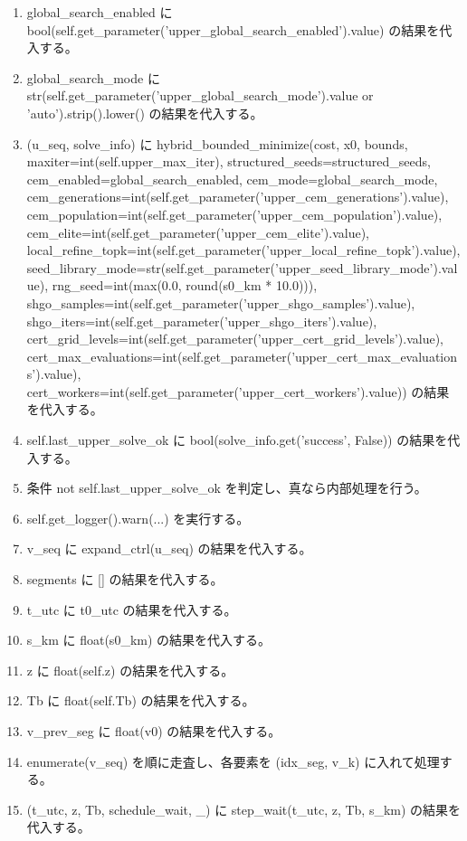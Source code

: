 \documentclass[a4paper,11pt]{article}
\begin{document}
\begin{enumerate}[leftmargin=1.8em]
\item global\_search\_enabled に bool(self.get\_parameter('upper\_global\_search\_enabled').value) の結果を代入する。
\item global\_search\_mode に str(self.get\_parameter('upper\_global\_search\_mode').value or 'auto').strip().lower() の結果を代入する。
\item (u\_seq, solve\_info) に hybrid\_bounded\_minimize(cost, x0, bounds, maxiter=int(self.upper\_max\_iter), structured\_seeds=structured\_seeds, cem\_enabled=global\_search\_enabled, cem\_mode=global\_search\_mode, cem\_generations=int(self.get\_parameter('upper\_cem\_generations').value), cem\_population=int(self.get\_parameter('upper\_cem\_population').value), cem\_elite=int(self.get\_parameter('upper\_cem\_elite').value), local\_refine\_topk=int(self.get\_parameter('upper\_local\_refine\_topk').value), seed\_library\_mode=str(self.get\_parameter('upper\_seed\_library\_mode').value), rng\_seed=int(max(0.0, round(s0\_km * 10.0))), shgo\_samples=int(self.get\_parameter('upper\_shgo\_samples').value), shgo\_iters=int(self.get\_parameter('upper\_shgo\_iters').value), cert\_grid\_levels=int(self.get\_parameter('upper\_cert\_grid\_levels').value), cert\_max\_evaluations=int(self.get\_parameter('upper\_cert\_max\_evaluations').value), cert\_workers=int(self.get\_parameter('upper\_cert\_workers').value)) の結果を代入する。
\item self.last\_upper\_solve\_ok に bool(solve\_info.get('success', False)) の結果を代入する。
\item 条件 not self.last\_upper\_solve\_ok を判定し、真なら内部処理を行う。
\item   self.get\_logger().warn(...) を実行する。
\item v\_seq に expand\_ctrl(u\_seq) の結果を代入する。
\item segments に [] の結果を代入する。
\item t\_utc に t0\_utc の結果を代入する。
\item s\_km に float(s0\_km) の結果を代入する。
\item z に float(self.z) の結果を代入する。
\item Tb に float(self.Tb) の結果を代入する。
\item v\_prev\_seg に float(v0) の結果を代入する。
\item enumerate(v\_seq) を順に走査し、各要素を (idx\_seg, v\_k) に入れて処理する。
\item   (t\_utc, z, Tb, schedule\_wait, \_) に step\_wait(t\_utc, z, Tb, s\_km) の結果を代入する。

\end{enumerate}
\end{document}
